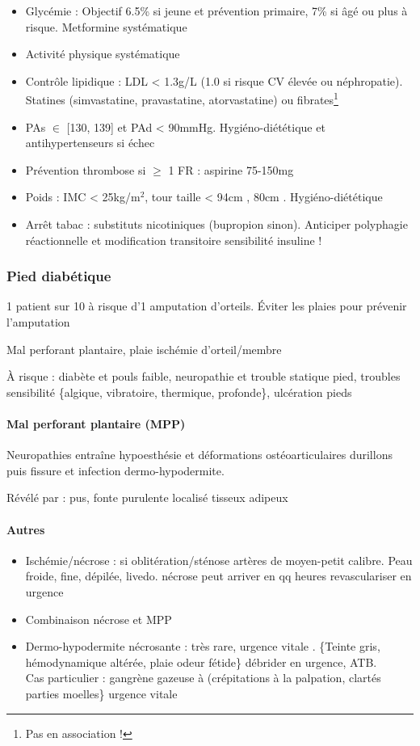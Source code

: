 \documentclass[11pt]{article}
\begin{document}
\begin{itemize}
\item Glycémie : Objectif 6.5\% si jeune et prévention primaire, 7\% si âgé ou plus à
risque. Metformine systématique
\item Activité physique systématique
\item Contrôle lipidique : LDL < 1.3g/L (1.0 si risque CV élevée ou
néphropatie). Statines (simvastatine, pravastatine, atorvastatine) ou fibrates\footnote{Pas en association !}
\item PAs \(\in\) [130, 139] et PAd < 90mmHg. Hygiéno-diététique et antihypertenseurs si
échec
\item Prévention thrombose si \(\ge\) 1 FR : aspirine 75-150mg
\item Poids : IMC < 25kg/m\(^{\text{2}}\), tour taille < 94cm \male, 80cm
\female. Hygiéno-diététique
\item Arrêt tabac : substituts nicotiniques (bupropion sinon). Anticiper polyphagie
réactionnelle et modification transitoire sensibilité insuline !
\end{itemize}

\subsubsection{Pied diabétique}
\label{sec:orgedbf2ac}
1 patient sur 10 à risque d'1 amputation d'orteils. Éviter les plaies pour prévenir l'amputation
\skull

Mal perforant plantaire, plaie ischémie d'orteil/membre

À risque : diabète et pouls faible, neuropathie et trouble statique pied,
troubles sensibilité \{algique, vibratoire, thermique, profonde\}, ulcération
pieds

\paragraph{Mal perforant plantaire (MPP)}
\label{sec:org4d3503d}
Neuropathies entraîne hypoesthésie et déformations
ostéoarticulaires \thus durillons puis fissure et infection \thus
dermo-hypodermite.

Révélé par : pus, fonte purulente localisé tisseux adipeux

\paragraph{Autres}
\label{sec:orgec99a21}
\begin{itemize}
\item Ischémie/nécrose : si oblitération/sténose artères de moyen-petit calibre. Peau
froide, fine, dépilée, livedo. \danger nécrose peut arriver en qq heures \thus
revasculariser en urgence \skull
\item Combinaison nécrose et MPP
\item Dermo-hypodermite nécrosante : très rare, urgence vitale \skull. \{Teinte gris,
hémodynamique altérée, plaie odeur fétide\} \thus débrider en urgence, ATB. \\
Cas particulier : gangrène gazeuse à  (crépitations à la
palpation, clartés parties moelles\} \thus urgence vitale \danger
\end{itemize}
\end{document}
